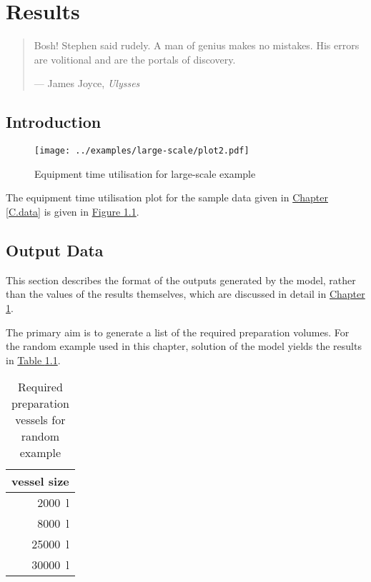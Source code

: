 %
%
%
%

\chapter{Results}\label{C.results}

\begin{quote}
Bosh! Stephen said rudely.
A man of genius makes no mistakes.
His errors are volitional and are the portals of discovery.

\hspace{2cm}--- James Joyce, \emph{Ulysses}
\end{quote}

\section{Introduction}\label{S.intro5}
\begin{figure}
    \centering
    \texttt{[image: ../examples/large-scale/plot2.pdf]}
    \caption{Equipment time utilisation for large-scale example}
    \label{fig.etu}
\end{figure}
The equipment time utilisation plot for the sample data given in 
\hyperref[C.data]{Chapter \ref*{C.data}} is given in
\hyperref[fig.etu]{Figure \ref*{fig.etu}}.

\section{Output Data}\label{S.outputdata}

This section describes the format of the outputs generated by the model, rather
than the values of the results themselves, which are discussed in detail in 
\hyperref[C.results]{Chapter \ref*{C.results}}.

The primary aim is to generate a list of the required preparation volumes.
For the random example used in this chapter, solution of the model yields
the results in \hyperref[tbl.reqvessels]{Table \ref*{tbl.reqvessels}}.

\begin{table}[h!]
    \centering
    \caption{Required preparation vessels for random example}
    \label{tbl.reqvessels}
    \begin{tabular}{r}
        vessel size\\ \hline
        \SI{2000}{\litre}\\
        \SI{8000}{\litre}\\
        \SI{25000}{\litre}\\
        \SI{30000}{\litre}\\
    \end{tabular}
\end{table}

